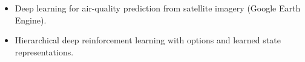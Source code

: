 {
\footnotesize
\begin{itemize}
\item Deep learning for air-quality prediction from satellite imagery (Google Earth Engine).
\end{itemize}
\vspace{-5pt}
}
\divider

{\footnotesize
\begin{itemize}
\item Hierarchical deep reinforcement learning with options and learned state representations.
\end{itemize}
\vspace{-5pt}
}
